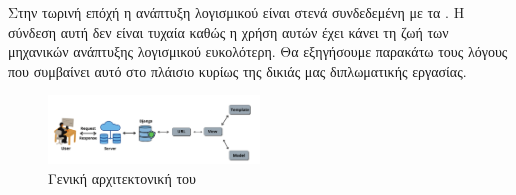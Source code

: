 Στην τωρινή επόχή η ανάπτυξη λογισμικού είναι στενά συνδεδεμένη με τα . Η σύνδεση αυτή δεν είναι τυχαία καθώς η χρήση αυτών έχει κάνει τη ζωή
των μηχανικών ανάπτυξης λογισμικού ευκολότερη. Θα εξηγήσουμε παρακάτω τους λόγους που συμβαίνει αυτό στο πλάισιο κυρίως της δικιάς μας διπλωματικής εργασίας.



\begin{figure}[htb]
	\centering
	\includegraphics[width=0.5\textwidth]{graphics/django_architecture.png}
	\caption{Γενική αρχιτεκτονική του }
\end{figure}

